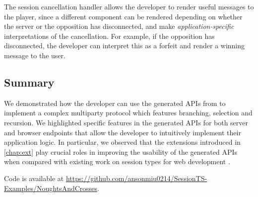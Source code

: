 The session cancellation handler allows the developer
to render useful messages to the player, since
a different component can be rendered depending on whether
the server or the opposition has disconnected,
and make \textit{application-specific} interpretations of the cancellation.
For example, if the opposition has disconnected,
the developer can interpret this as a forfeit and
render a winning message to the user.

\subsection{Summary}
We demonstrated how the developer can use the generated APIs
from \codegen to implement a complex multiparty protocol
which features branching, selection and recursion.
We highlighted specific features in the generated APIs for both
server and browser endpoints that allow the developer
to intuitively implement their application logic.
In particular, we observed that the extensions introduced
in \cref{chap:ext} play crucial roles in
improving the usability of the generated APIs when
compared with existing work on session types for web development 
\cite{PureScript2019,MVU2020,LINKS}.

Code is available at 
\url{https://github.com/ansonmiu0214/SessionTS-Examples/NoughtsAndCrosses}.